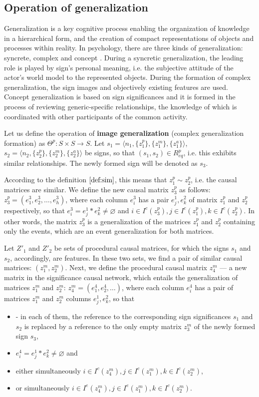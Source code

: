 \documentclass[12pt]{scrartcl}
\begin{document}
	\subsection{Operation of generalization}
	Generalization is a key cognitive process enabling the organization of knowledge in a hierarchical form, and the creation of compact representations of objects and processes within reality. In psychology, there are three kinds of generalization: syncrete, complex and concept \cite{Vygotsky1999}. During a syncretic generalization, the leading role is played by sign's personal meaning, i.e. the subjective attitude of the actor's world model to the represented objects. During the formation of complex generalization, the sign images and objectively existing features are used. Concept generalization is based on sign significances and it is formed in the process of reviewing generic-specific relationships, the knowledge of which is coordinated with other participants of the common activity.
	
	Let us define the operation of \textbf{image generalization} (complex generalization formation) as $\Theta^p: S\times S\rightarrow S$. Let $s_1=\langle n_1, \{z_1^p\}, \{z_1^m\}, \{z_1^a\} \rangle$, $s_2=\langle n_2, \{z_2^p\}, \{z_2^m\}, \{z_2^a\} \rangle$ be signs, so that $(s_1,s_2)\in R_{eq}^p$, i.e. this exhibits similar relationships. The newly formed sign will be denoted as $s_3$.
	
	According to the definition $\autoref{def:sim}$, this means that $z_1^p\sim z_2^p$, i.e. the causal matrices are similar. We define the new causal matrix $z_3^p$ as follows: $z_3^p=(e_1^3,e_2^3,\dots,e_h^3)$, where each column $e_i^3$ has a pair $e_j^1, e_k^2$ of matrix $z_1^p$ and $z_2^p$ respectively, so that $e_i^3=e_j^1*e_k^2\not=\varnothing$ and $i\in I^c(z_3^p), j\in I^c(z_1^p), k\in I^c(z_2^p)$. In other words, the matrix $z_3^p$ is a generalization of the matrices $z_1^p$ and $z_2^p$ containing only the events, which are an event generalization for both matrices.
	
	Let $Z'_1$ and $Z'_2$ be sets of procedural causal matrices, for which the signs $s_1$ and $s_2$, accordingly, are features. In these two sets, we find a pair of similar causal matrices: $(z_1^m,z_2^m)$. Next, we define the procedural causal matrix $z_4^m$ --- a new matrix in the significance causal network, which entails the generalization of matrices $z_1^m$ and $z_2^m$: $z_4^m=(e_1^4,e_2^4,\dots)$, where each column $e_i^4$ has a pair of matrices $z_1^m$ and $z_2^m$ columns $e_j^1, e_k^2$, so that
	\begin{itemize}
		\item -	in each of them, the reference to the corresponding sign significances $s_1$ and $s_2$ is replaced by a reference to the only empty matrix $z_3^m$ of the newly formed sign $s_3$,
		\item $e_i^4=e_j^1*e_k^2\not=\varnothing$ and 
		\item either simultaneously $i\in I^c(z_4^m), j\in I^c(z_1^m), k\in I^c(z_2^m)$, 
		\item or simultaneously  $i\in I^e(z_4^m), j\in I^e(z_1^m), k\in I^c(z_2^m)$.
	\end{itemize}
	
\end{document}
